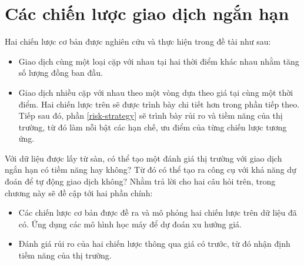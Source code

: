 \section{Các chiến lược giao dịch ngắn hạn}\label{strategy_describing}
Hai chiến lược cơ bản được nghiên cứu và thực hiện trong đề tài như sau:
\begin{itemize}
    \item Giao dịch cùng một loại cặp với nhau tại hai thời điểm khác nhau nhằm tăng số lượng đồng ban đầu.
    \item Giao dịch nhiều cặp với nhau theo một vòng dựa theo giá tại cùng một thời điểm.
Hai chiến lược trên sẽ được trình bày chi tiết hơn trong phần tiếp theo. Tiếp sau đó, phần \ref{risk-strategy} sẽ trình bày rủi ro và tiềm năng của thị trường, từ đó làm nỗi bật các hạn chế, ưu điểm của từng chiến lược tương ứng.
\end{itemize}
Với dữ liệu được lấy từ sàn, có thể tạo một đánh giá thị trường với giao dịch ngắn hạn có tiềm năng hay không? Từ đó có thể tạo ra công cụ với khả năng dự đoán để tự động giao dịch không?  Nhằm trả lời cho hai câu hỏi trên, trong chương này sẽ đề cập tới hai phần chính:
\begin{itemize}
    \item Các chiến lược cơ bản được đề ra và mô phỏng hai chiến lược trên dữ liệu đã có. Ứng dụng các mô hình học máy để dự đoán xu hướng giá.
    \item  Đánh giá rủi ro của hai chiến lược thông qua giá có trước, từ đó nhận định tiềm năng của thị trường.
\end{itemize}
